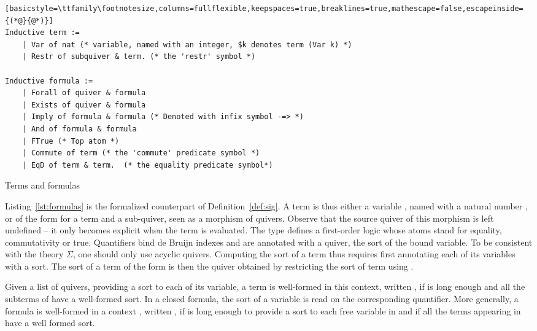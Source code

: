 \begin{listing}[!t]
\begin{lstlisting}[basicstyle=\ttfamily\footnotesize,columns=fullflexible,keepspaces=true,breaklines=true,mathescape=false,escapeinside={(*@}{@*)}]
Inductive term :=
    | Var of nat (* variable, named with an integer, $k denotes term (Var k) *)
    | Restr of subquiver & term. (* the 'restr' symbol *)

Inductive formula :=
    | Forall of quiver & formula
    | Exists of quiver & formula
    | Imply of formula & formula (* Denoted with infix symbol -=> *)
    | And of formula & formula
    | FTrue (* Top atom *)
    | Commute of term (* the 'commute' predicate symbol *)
    | EqD of term & term.  (* the equality predicate symbol*)
\end{lstlisting}
\caption{Terms and formulas}
\label{lst:formulas}
\end{listing}

Listing~\ref{lst:formulas} is the formalized counterpart of Definition~\ref{def:sig}. A term  is thus either a variable , named with a natural number , or of the form  for  a term and  a sub-quiver, seen as a morphism of quivers. Observe that the source quiver of this morphism is left undefined -- it only becomes explicit when the term is evaluated. The type  defines a first-order logic whose atoms stand for equality, commutativity or true. Quantifiers bind de Bruijn indexes and are annotated with a quiver, the sort of the bound variable. To be consistent with the theory $\Sigma$, one should only use acyclic quivers. Computing the sort of a term thus requires first annotating each of its variables with a sort. The sort of  a term of the form  is then the quiver obtained by restricting the sort of term  using .

Given a list  of quivers, providing a sort to each of its variable, a term  is well-formed in this context, written , if  is long enough and all the subterms of  have a well-formed sort. In a closed formula, the sort of a variable is read on the corresponding quantifier. More generally, a formula  is well-formed in a context , written , if  is long enough to provide a sort to each free variable in  and if all the terms appearing in  have a well formed sort.

